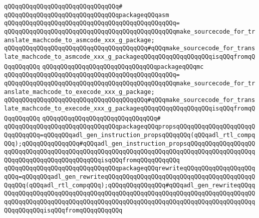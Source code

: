 \verb|qQQqqQQqqQQqqQQqqQQqqQQqqQQqqQQq#|\newline
\verb|qQQqqQQqqQQqqQQqqQQqqQQqqQQqqQQqpackageqQQqasm|\newline
\verb|qQQqqQQqqQQqqQQqqQQqqQQqqQQqqQQqqQQqqQQqqQQqqQQq=|\newline
\verb|qQQqqQQqqQQqqQQqqQQqqQQqqQQqqQQqqQQqqQQqqQQqqQQqmake_sourcecode_for_translate_machcode_to_asmcode_xxx_g_package;|\newline
\verb|qQQqqQQqqQQqqQQqqQQqqQQqqQQqqQQqqQQqqQQq#qQQqmake_sourcecode_for_translate_machcode_to_asmcode_xxx_g_packageqQQqqQQqqQQqqQQqqQQqisqQQqfromqQQqqQQqqQQq|\newline
\newline
\verb|qQQqqQQqqQQqqQQqqQQqqQQqqQQqqQQqpackageqQQqmc|\newline
\verb|qQQqqQQqqQQqqQQqqQQqqQQqqQQqqQQqqQQqqQQqqQQqqQQq=|\newline
\verb|qQQqqQQqqQQqqQQqqQQqqQQqqQQqqQQqqQQqqQQqqQQqqQQqmake_sourcecode_for_translate_machcode_to_execode_xxx_g_package;|\newline
\verb|qQQqqQQqqQQqqQQqqQQqqQQqqQQqqQQqqQQqqQQq#qQQqmake_sourcecode_for_translate_machcode_to_execode_xxx_g_packageqQQqqQQqqQQqqQQqqQQqisqQQqfromqQQqqQQqqQQq|\newline
\verb|qQQqqQQqqQQqqQQqqQQqqQQqqQQqqQQq#|\newline
\verb|qQQqqQQqqQQqqQQqqQQqqQQqqQQqqQQqpackageqQQqpropsqQQqqQQqqQQqqQQqqQQqqQQqqQQqqQQq=qQQqqQQqadl_gen_instruction_propsqQQqqQQq(qQQqadl_rtl_compqQQq);qQQqqQQqqQQqqQQq#qQQqadl_gen_instruction_propsqQQqqQQqqQQqqQQqqQQqqQQqqQQqqQQqqQQqqQQqqQQqqQQqqQQqqQQqqQQqqQQqqQQqqQQqqQQqqQQqqQQqqQQqqQQqqQQqqQQqqQQqqQQqqQQqqQQqisqQQqfromqQQqqQQqqQQq|\newline
\verb|qQQqqQQqqQQqqQQqqQQqqQQqqQQqqQQqpackageqQQqrewriteqQQqqQQqqQQqqQQqqQQqqQQq=qQQqqQQqadl_gen_rewriteqQQqqQQqqQQqqQQqqQQqqQQqqQQqqQQqqQQqqQQqqQQqqQQq(qQQqadl_rtl_compqQQq);qQQqqQQqqQQqqQQq#qQQqadl_gen_rewriteqQQqqQQqqQQqqQQqqQQqqQQqqQQqqQQqqQQqqQQqqQQqqQQqqQQqqQQqqQQqqQQqqQQqqQQqqQQqqQQqqQQqqQQqqQQqqQQqqQQqqQQqqQQqqQQqqQQqqQQqqQQqqQQqqQQqqQQqqQQqqQQqqQQqqQQqqQQqisqQQqfromqQQqqQQqqQQq|\newline
